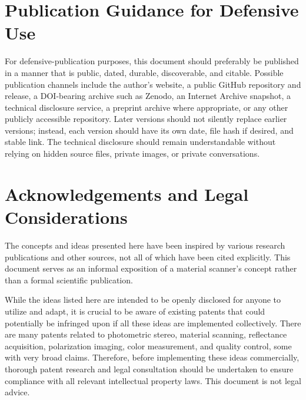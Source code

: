 \documentclass[11pt, twoside, listof=totocnumbered, bibliography=totocnumbered]{scrartcl}
\begin{document}
	\section{Publication Guidance for Defensive Use}
	For defensive-publication purposes, this document should preferably be published in a manner that is public, dated, durable, discoverable, and citable. Possible publication channels include the author's website, a public GitHub repository and release, a DOI-bearing archive such as Zenodo, an Internet Archive snapshot, a technical disclosure service, a preprint archive where appropriate, or any other publicly accessible repository. Later versions should not silently replace earlier versions; instead, each version should have its own date, file hash if desired, and stable link. The technical disclosure should remain understandable without relying on hidden source files, private images, or private conversations.
	
	\section{Acknowledgements and Legal Considerations}
	The concepts and ideas presented here have been inspired by various research publications and other sources, not all of which have been cited explicitly. This document serves as an informal exposition of a material scanner's concept rather than a formal scientific publication.
	
	While the ideas listed here are intended to be openly disclosed for anyone to utilize and adapt, it is crucial to be aware of existing patents that could potentially be infringed upon if all these ideas are implemented collectively. There are many patents related to photometric stereo, material scanning, reflectance acquisition, polarization imaging, color measurement, and quality control, some with very broad claims. Therefore, before implementing these ideas commercially, thorough patent research and legal consultation should be undertaken to ensure compliance with all relevant intellectual property laws. This document is not legal advice.
	
	\newpage
\end{document}
